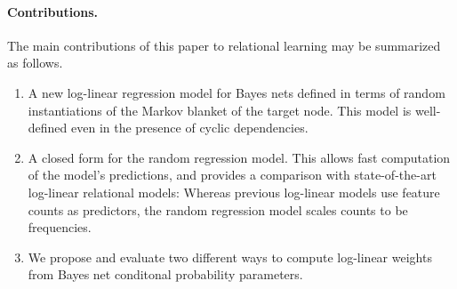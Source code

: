 \documentclass[twoside,leqno,twocolumn]{article}
\begin{document}
\paragraph{Contributions.}
The main contributions of this paper to relational learning may be summarized as follows.

\begin{enumerate}
\item A new log-linear regression model for Bayes nets defined in terms of random instantiations of the Markov blanket of the target node. This model is well-defined even in the presence of cyclic dependencies.
\item A closed form for the random regression model. This allows fast computation of the model's predictions, and provides a comparison with state-of-the-art log-linear relational models: Whereas previous log-linear models use feature counts as predictors, the random regression model scales counts to be frequencies.  
\item We propose and evaluate two different ways to compute log-linear weights from Bayes net conditonal probability parameters.
\end{enumerate}
\end{document}
